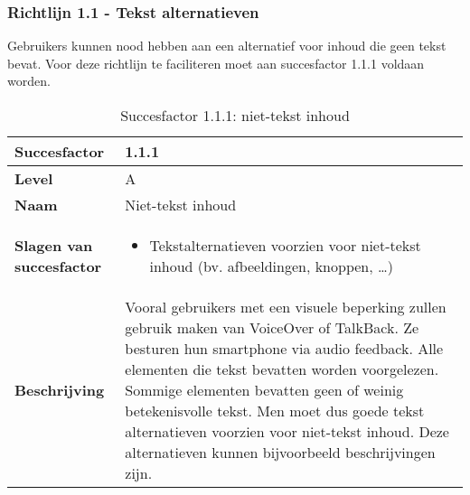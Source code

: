 \subsubsection{Richtlijn 1.1 - Tekst alternatieven}
Gebruikers kunnen nood hebben aan een alternatief voor inhoud die geen tekst bevat. Voor deze richtlijn te faciliteren moet aan succesfactor 1.1.1 voldaan worden.
\newpage
\begin{table}[H]
    \centering
    \caption{Succesfactor 1.1.1: niet-tekst inhoud}
 \hspace*{-1cm}\begin{tabular}{|l|p{12cm}|} 
        \hline
        \textbf{Succesfactor}                & 1.1.1                                                                                                                                                                                                                                                                                                             \\ 
        \hline
        \textbf{Level}                       & A                                                                                                                                                                                                                                                                                                                                                                             \\ 
        \hline
        \textbf{Naam}                        & Niet-tekst inhoud~                                                                                                                                                                                                                                                                                                                                                            \\ 
        \hline
        \textbf{Slagen van succesfactor}     & \begin{itemize}
            \item Tekstalternatieven voorzien voor niet-tekst inhoud (bv. afbeeldingen, knoppen, …)
        \end{itemize}                                                                                                                                                                                                      \\ 
        \hline
        \textbf{Beschrijving}                & Vooral gebruikers met een visuele beperking zullen gebruik maken van VoiceOver of TalkBack. Ze besturen hun smartphone via audio feedback. Alle elementen die tekst bevatten worden voorgelezen. Sommige elementen bevatten geen of weinig betekenisvolle tekst. Men moet dus goede tekst alternatieven voorzien voor niet-tekst inhoud. Deze alternatieven kunnen bijvoorbeeld beschrijvingen zijn.  \\ 

\end{tabular}
\end{table}
